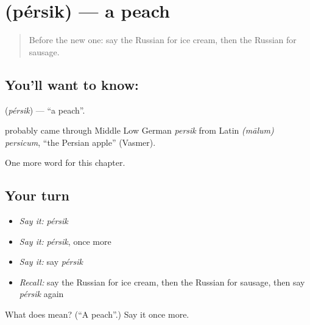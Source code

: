 \section[\texorpdfstring{\ru{персик} (pérsik)}{персик (pérsik)}]{ (pérsik) — a peach}

\label{lesson:RU-C106-peach}



\begin{quote}
Before the new one: say the Russian for ice cream, then the Russian for sausage.
\end{quote}

\subsection*{You'll want to know: }
\textbf{} (\emph{pérsik}) — \textquotedblleft{}a peach\textquotedblright{}.

\begin{cousinweb}
\textbf{} probably came through Middle Low German \emph{persik} from Latin \emph{(mālum) persicum}, \textquotedblleft{}the Persian apple\textquotedblright{} (Vasmer).
\end{cousinweb}

\begin{grammarlens}[title={What you've built}]
One more word for this chapter.
\end{grammarlens}

\subsection*{Your turn}
\begin{itemize}
\raggedright
  \item \emph{Say it:} \emph{pérsik}
  \item \emph{Say it:} \emph{pérsik}, once more
  \item \emph{Say it:} say \emph{pérsik}
  \item \emph{Recall:} say the Russian for ice cream, then the Russian for sausage, then say \emph{pérsik} again
\end{itemize}

\begin{tcolorbox}[breakable,colback=teal!4,colframe=teal!35!black,title={Before you move on}]
What does  mean? (\textquotedblleft{}A peach\textquotedblright{}.) Say it once more.
\end{tcolorbox}
